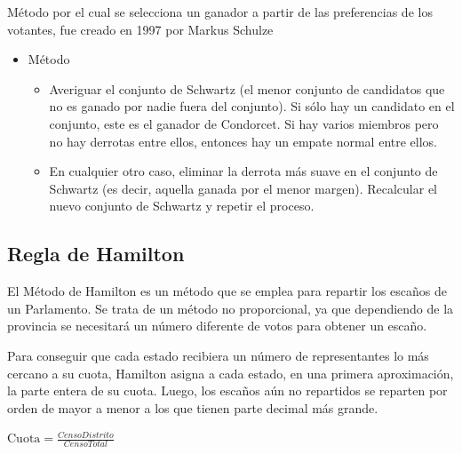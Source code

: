 \documentclass[12pt,a4paper,]{book}
\def\ifdoblecara{} %
\def\ifprincipal{} %
\providecommand{\tightlist}{%
  \setlength{\itemsep}{0pt}\setlength{\parskip}{0pt}}
\numberwithin{dummy}{section}
\theoremstyle{ocrenumbox}
\theoremstyle{blacknumex}
\theoremstyle{blacknumbox}
\theoremstyle{ocrenum}
\theoremstyle{ocrenum}
\begin{document}
Método por el cual se selecciona un ganador a partir de las preferencias
de los votantes, fue creado en 1997 por Markus Schulze

\begin{itemize}
\item
  Método

  \begin{itemize}
  \tightlist
  \item
    Averiguar el conjunto de Schwartz (el menor conjunto de candidatos
    que no es ganado por nadie fuera del conjunto). Si sólo hay un
    candidato en el conjunto, este es el ganador de Condorcet. Si hay
    varios miembros pero no hay derrotas entre ellos, entonces hay un
    empate normal entre ellos.
  \item
    En cualquier otro caso, eliminar la derrota más suave en el conjunto
    de Schwartz (es decir, aquella ganada por el menor margen).
    Recalcular el nuevo conjunto de Schwartz y repetir el proceso.
  \end{itemize}
\end{itemize}

\hypertarget{regla-de-hamilton}{%
\subsection{Regla de Hamilton}\label{regla-de-hamilton}}

El Método de Hamilton es un método que se emplea para repartir los
escaños de un Parlamento. Se trata de un método no proporcional, ya que
dependiendo de la provincia se necesitará un número diferente de votos
para obtener un escaño.

Para conseguir que cada estado recibiera un número de representantes lo
más cercano a su cuota, Hamilton asigna a cada estado, en una primera
aproximación, la parte entera de su cuota. Luego, los escaños aún no
repartidos se reparten por orden de mayor a menor a los que tienen parte
decimal más grande.

\(\textrm{Cuota} = \frac{Censo Distrito}{Censo Total}\)

\FloatBarrier

\ifdefined\ifprincipal
\else
\setlength{\parindent}{1em}
\pagestyle{fancy}
\setcounter{tocdepth}{4}
\tableofcontents

\fi

\ifdefined\ifdoblecara
\fancyhead{}{}
\fancyhead[LE,RO]{\scriptsize\rightmark}
\fancyfoot[LO,RE]{\scriptsize\slshape \leftmark}
\fancyfoot[C]{}
\fancyfoot[LE,RO]{\footnotesize\thepage}
\else
\fancyhead{}{}
\fancyhead[RO]{\scriptsize\rightmark}
\fancyfoot[LO]{\scriptsize\slshape \leftmark}
\fancyfoot[C]{}
\fancyfoot[RO]{\footnotesize\thepage}
\fi
\renewcommand{\headrulewidth}{0.4pt}
\renewcommand{\footrulewidth}{0.4pt}
\end{document}
